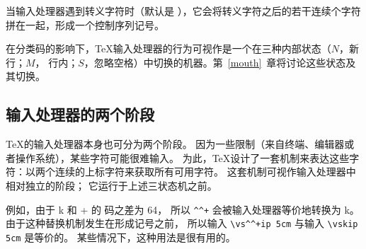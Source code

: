 \documentclass{book}
\begin{document}
当输入处理器遇到转义字符时（默认是 \cs{}），它会将转义字符之后的若干连续个字符拼在一起，形成一个控制序列记号。

在分类码的影响下，\TeX 输入处理器的行为可视作是一个在三种内部状态（$N$，新行；$M$，
行内；$S$，忽略空格）中切换的机器。第~\ref{mouth}~章将讨论这些状态及其切换。

\subsection{输入处理器的两个阶段}

\TeX 的输入处理器本身也可分为两个阶段。
因为一些限制（来自终端、编辑器或者操作系统），某些字符可能很难输入。
为此，\TeX 设计了一套机制来表达这些字符：以两个连续的上标字符来获取所有可用字符。
这套机制可视作输入处理器中相对独立的阶段；
它运行于上述三状态机之前。

例如，由于 \n k 和 \n + 的 \ascii{} 码之差为 64，
所以 \verb>^^+> 会被输入处理器等价地转换为 \n k。
由于这种替换机制发生在形成记号之前，
所以输入 \verb>\vs^^+ip 5cm> 与输入 \verb>\vskip 5cm> 是等价的。
某些情况下，这种用法是很有用的。
\end{document}
